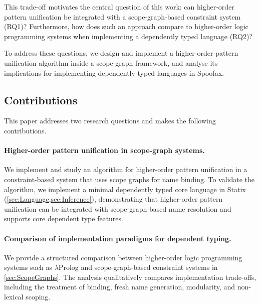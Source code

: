 This trade-off motivates the central question of this work: can higher-order pattern unification be integrated with a scope-graph-based constraint system (RQ1)? Furthermore, how does such an approach compare to higher-order logic programming systems when implementing a dependently typed language (RQ2)?

To address these questions, we design and implement a higher-order pattern unification algorithm inside a scope-graph framework, and analyse its implications for implementing dependently typed languages in Spoofax.

\subsection{\label{sec:contributions}Contributions}

This paper addresses two research questions and makes the following contributions.

\paragraph{Higher-order pattern unification in scope-graph systems.}
We implement and study an algorithm for higher-order pattern unification in a constraint-based system that uses scope graphs for name binding. To validate the algorithm, we implement a minimal dependently typed core language in Statix (\cref{sec:Language,sec:Inference}), demonstrating that higher-order pattern unification can be integrated with scope-graph-based name resolution and supports core dependent type features.

\paragraph{Comparison of implementation paradigms for dependent typing.}
We provide a structured comparison between higher-order logic programming systems such as $\lambda$Prolog and scope-graph-based constraint systems in \cref{sec:ScopeGraphs}. The analysis qualitatively compares implementation trade-offs, including the treatment of binding, fresh name generation, modularity, and non-lexical scoping.